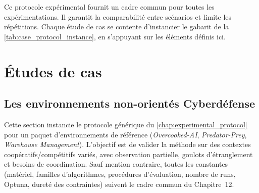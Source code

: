 Ce protocole expérimental fournit un cadre commun pour toutes les expérimentations.
Il garantit la comparabilité entre scénarios et limite les répétitions.
Chaque étude de cas se contente d’instancier le gabarit de la \autoref{tab:case_protocol_instance}, en s’appuyant sur les éléments définis ici.


\chapter{Études de cas}

\section{Les environnements non-orientés Cyberdéfense}
\label{sec:non_cyberdefense_envs}

Cette section instancie le protocole générique du \autoref{chap:experimental_protocol} pour un paquet d’environnements de référence (\textit{Overcooked-AI}, \textit{Predator-Prey}, \textit{Warehouse Management}).
L’objectif est de valider la méthode  sur des contextes coopératifs/compétitifs variés, avec observation partielle, goulots d’étranglement et besoins de coordination.
Sauf mention contraire, toutes les constantes (matériel, familles d’algorithmes, procédures d’évaluation, nombre de runs, Optuna, dureté des contraintes) suivent le cadre commun du Chapitre~12.

